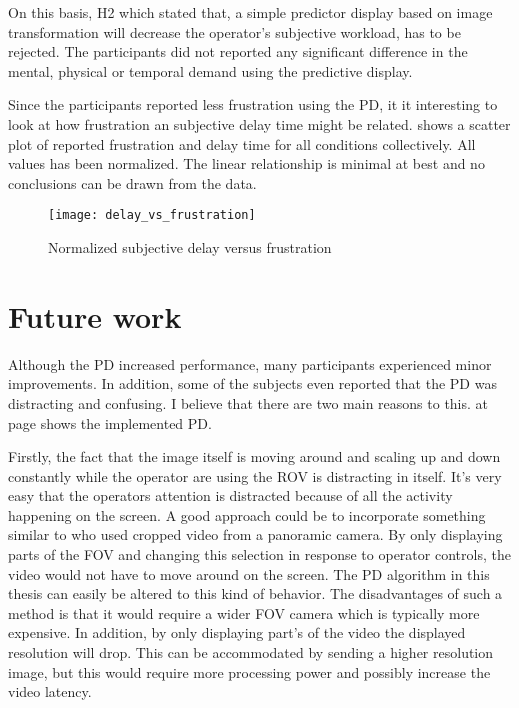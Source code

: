 On this basis, H2 which stated that, a simple predictor display based on image transformation will decrease the operator's subjective workload, has to be rejected. The participants did not reported any significant difference in the mental, physical or temporal demand using the predictive display.

Since the participants reported less frustration using the PD, it it interesting to look at how frustration an subjective delay time might be related.  shows a scatter plot of reported frustration and delay time for all conditions collectively. All values has been normalized. The linear relationship is minimal at best and no conclusions can be drawn from the data.


\begin{figure}[h!]
    \centering
    \texttt{[image: delay\_vs\_frustration]}
    \caption{Normalized subjective delay versus frustration}
    \label{delay_vs_frustration}
\end{figure}


\section{Future work}

Although the PD increased performance, many participants experienced minor improvements. In addition, some of the subjects even reported that the PD was distracting and confusing. I believe that there are two main reasons to this.  at page \pageref{predictorvis} shows the implemented PD.

Firstly, the fact that the image itself is moving around and scaling up and down constantly while the operator are using the ROV is distracting in itself. It's very easy that the operators attention is distracted because of all the activity happening on the screen. A good approach could be to incorporate something similar to \citep{Baldwin1999} who used cropped video from a panoramic camera. By only displaying parts of the FOV and changing this selection in response to operator controls, the video would not have to move around on the screen. The PD algorithm in this thesis can easily be altered to this kind of behavior. The disadvantages of such a method is that it would require a wider FOV camera which is typically more expensive. In addition, by only displaying part's of the video the displayed resolution will drop. This can be accommodated by sending a higher resolution image, but this would require more processing power and possibly increase the video latency.

